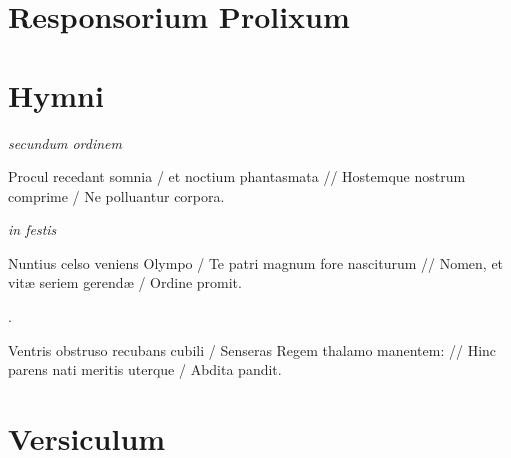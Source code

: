 \section*{Responsorium Prolixum}
\newpage
\section*{Hymni}
\textit{secundum ordinem}\par
{}\par
\begin{multicols}{2}\setlength{\columnseprule}{0.2px}
Procul recedant somnia / et noctium phantasmata // Hostemque nostrum comprime / Ne polluantur corpora.\par
{}\par
\end{multicols}
\textit{in festis}\par
{}
\par
\vskip9bp
\begin{multicols}{2}\setlength{\columnseprule}{0.2px}
Nuntius celso veniens Olympo / Te patri magnum fore nasciturum // Nomen, et vitæ seriem gerendæ / Ordine promit.\par
{}.\par\vfill\columnbreak
Ventris obstruso recubans cubili / Senseras Regem thalamo manentem: // Hinc parens nati meritis uterque / Abdita pandit.\par
{}\par
\end{multicols}\par\vskip9mm
\section*{Versiculum}
\newpage
